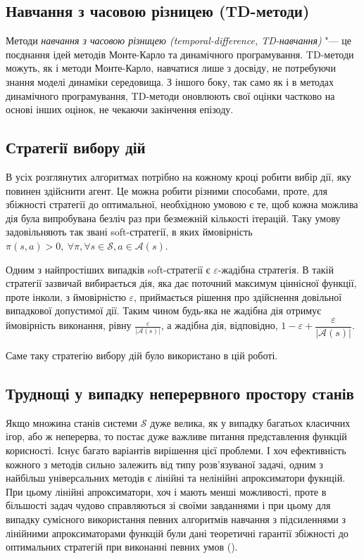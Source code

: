 \documentclass[a4paper,10pt]{article}
\begin{document}
\subsection{Навчання з часовою різницею (TD-методи)}

Методи \emph{навчання з часовою різницею (temporal-difference, TD-навчання)} "--- це поєднання ідей методів Монте-Карло та динамічного програмування. TD-методи можуть, як і методи Монте-Карло, навчатися лише з досвіду, не потребуючи знання моделі динаміки середовища. З іншого боку, так само як і в методах динамічного програмування, TD-методи оновлюють свої оцінки частково на основі інших оцінок, не чекаючи закінчення епізоду.

\subsection{Стратегії вибору дій}
В усіх розглянутих алгоритмах потрібно на кожному кроці робити вибір дії, яку повинен здійснити агент. Це можна робити різними способами, проте, для збіжності стратегії до оптимальної, необхідною умовою є те, щоб кожна можлива дія була випробувана безліч раз при безмежній кількості ітерацій. Таку умову задовільняють так звані soft-стратегії, в яких ймовірність $\pi(s,a)>0,\ \forall \pi, \forall s \in \mathcal{S}, a \in \mathcal{A}(s)$.

Одним з найпростіших випадків soft-стратегії є $\varepsilon$-жадібна стратегія. В такій стратегії зазвичай вибирається дія, яка дає поточний максимум ціннісної функції, проте інколи, з ймовірністю $\varepsilon$, приймається рішення про здійснення довільної випадкової допустимої дії. Таким чином будь-яка не жадібна дія отримує ймовірність виконання, рівну $\frac{\varepsilon}{|\mathcal{A}(s)|}$, а жадібна дія, відповідно, $ 1 - \varepsilon + \dfrac{\varepsilon}{|\mathcal{A}(s)|}$.

Саме таку стратегію вибору дій було використано в цій роботі.

\subsection{Труднощі у випадку неперервного простору станів}

Якщо множина станів системи $\mathcal{S}$ дуже велика, як у випадку багатьох класичних ігор, або ж неперерва, то постає дуже важливе питання представлення функцій корисності. Існує багато варіантів вирішення цієї проблеми. І хоч ефективність кожного з методів сильно залежить від типу розв'язуваної задачі, одним з найбільш універсальних методів є лінійні та нелінійні апроксиматори фукнцій. При цьому лінійні апроксиматори, хоч і мають менші можливості, проте в більшості задач чудово справляються зі своїми завданнями і при цьому для випадку сумісного використання певних алгоритмів навчання з підсиленнями з лінійними апроксиматорами функцій були дані теоретичні гарантії збіжності до оптимальних стратегій при виконанні певних умов (\cite{Coulom2002}).
\end{document}
